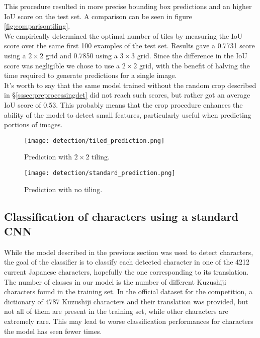 This procedure resulted in more precise bounding box predictions and an higher IoU score on the test set. A comparison can be seen in figure \ref{fig:comparisontiling}. \\
We empirically determined the optimal number of tiles by measuring the IoU score over the same first 100 examples of the test set. Results gave a 0.7731 score using a $2 \times 2$ grid and 0.7850 using a $3 \times 3$ grid. 
Since the difference in the IoU score was negligible we chose to use a $2 \times 2$ grid, with the benefit of halving the time required to generate predictions for a single image.\\
It's worth to say that the same model trained without the random crop described in §\ref{sssec:preprocessingdet} did not reach such scores, but rather got an average IoU score of 0.53. This probably means that the crop procedure enhances the ability of the model to detect small features, particularly useful when predicting portions of images.

\begin{figure*}[h!]
	\centering
	\begin{subfigure}{\columnwidth}
		\centering
		\texttt{[image: detection/tiled\_prediction.png]}
		\caption{Prediction with $2\times2$ tiling.}
		\label{fig:tiledpred}
	\end{subfigure}
	\begin{subfigure}{\columnwidth}
		\centering
		\texttt{[image: detection/standard\_prediction.png]}
		\caption{Prediction with no tiling.}
		\label{fig:standardpred}
	\end{subfigure}
	\caption{Comparison of prediction on the same page with and without tiling. Image (\ref{fig:tiledpred}) got an IoU score of 0.83, while (\ref{fig:standardpred}) scored 0.59.}
	\label{fig:comparisontiling}
\end{figure*}

\subsection{Classification of characters using a standard CNN}
\label{ssec:classificationcnn}

While the model described in the previous section was used to detect characters, the goal of the classifier is to classify each detected character in one of the 4212 current Japanese characters, hopefully the one corresponding to its translation. The number of classes in our model is the number of different Kuzushiji characters found in the training set. In the official dataset for the competition, a dictionary of 4787 Kuzushiji characters and their translation was provided, but not all of them are present in the training set, while other characters are extremely rare. This may lead to worse classification performances for characters the model has seen fewer times.

